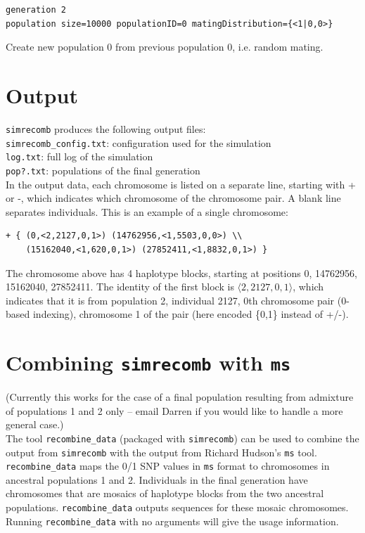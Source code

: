 \documentclass{article}
\begin{document}
\begin{verbatim}
generation 2
population size=10000 populationID=0 matingDistribution={<1|0,0>}
\end{verbatim}

\noindent Create new population 0 from previous population 0, i.e. random mating.


\section*{Output}

\texttt{simrecomb} produces the following output files: \\

\noindent
\texttt{simrecomb\_config.txt}:  configuration used for the simulation \\
\texttt{log.txt}:  full log of the simulation \\
\texttt{pop?.txt}:  populations of the final generation \\

\noindent In the output data, each chromosome is listed on a separate
line, starting with + or -, which indicates which chromosome of the 
chromosome pair.  A blank line separates individuals. 
This is an example of a single chromosome:
\begin{verbatim}
+ { (0,<2,2127,0,1>) (14762956,<1,5503,0,0>) \\
    (15162040,<1,620,0,1>) (27852411,<1,8832,0,1>) }
\end{verbatim}

\noindent The chromosome above has 4 haplotype
blocks, starting at positions 0, 14762956, 15162040, 27852411.  The identity of
the first block is $\langle 2,2127,0,1 \rangle$, which indicates that it is from
population 2, individual 2127, 0th chromosome pair (0-based indexing),
chromosome 1 of the pair (here encoded \{0,1\} instead of +/-).



\section*{Combining \texttt{simrecomb} with \texttt{ms}}

(Currently this works for the case of a final population resulting from
admixture of populations 1 and 2 only -- email Darren if you would like
to handle a more general case.) \\

\noindent The tool \texttt{recombine\_data} (packaged with \texttt{simrecomb}) can be
used to combine the output from \texttt{simrecomb} with the output from Richard
Hudson's \texttt{ms} tool. \\

\noindent \texttt{recombine\_data} maps the 0/1 SNP values in \texttt{ms} format to
chromosomes in ancestral populations 1 and 2.  Individuals in the final
generation have chromosomes that are mosaics of haplotype blocks from the two
ancestral populations.  \texttt{recombine\_data} outputs sequences for these
mosaic chromosomes. \\

\noindent Running \texttt{recombine\_data} with no arguments will give the
usage information. \\
\end{document}
